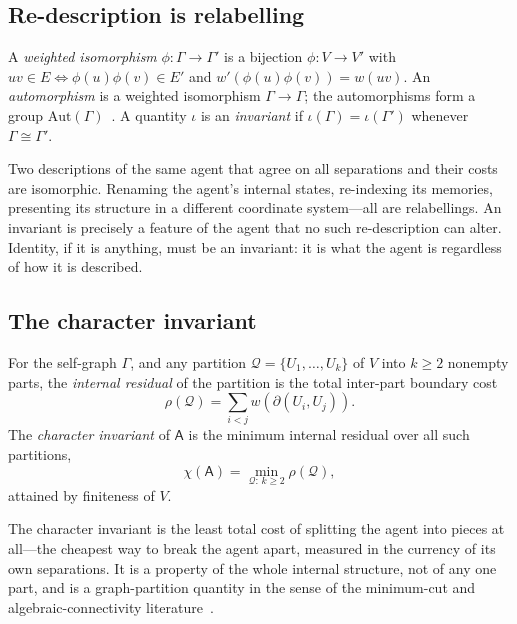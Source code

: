 \documentclass[11pt,twocolumn,a4paper]{article}
\newcommand{\Agent}{\mathsf{A}}
\newcommand{\Self}{\Gamma}          %
\newcommand{\V}{V}
\newcommand{\E}{E}
\newcommand{\wt}{w}
\newcommand{\cut}{\partial}
\newcommand{\Char}{\chi}             %
\begin{document}
\subsection{Re-description is relabelling}

\begin{definition}
\label{def:iso}
A \emph{weighted isomorphism} $\phi:\Self\to\Self'$ is a bijection
$\phi:\V\to\V'$ with $uv\in\E\iff\phi(u)\phi(v)\in\E'$ and
$\wt'(\phi(u)\phi(v))=\wt(uv)$. An \emph{automorphism} is a weighted
isomorphism $\Self\to\Self$; the automorphisms form a group
$\mathrm{Aut}(\Self)$~\cite{godsilroyle2001}. A quantity $\iota$ is an
\emph{invariant} if $\iota(\Self)=\iota(\Self')$ whenever
$\Self\cong\Self'$.
\end{definition}

\begin{remark}
\label{rem:relabel}
Two descriptions of the same agent that agree on all separations and
their costs are isomorphic. Renaming the agent's internal states,
re-indexing its memories, presenting its structure in a different
coordinate system---all are relabellings. An invariant is precisely a
feature of the agent that no such re-description can alter. Identity, if
it is anything, must be an invariant: it is what the agent is regardless
of how it is described.
\end{remark}

\subsection{The character invariant}

\begin{definition}
\label{def:char}
For the self-graph $\Self$, and any partition
$\mathcal{Q}=\{U_1,\dots,U_k\}$ of $\V$ into $k\ge2$ nonempty parts, the
\emph{internal residual} of the partition is the total inter-part
boundary cost
\[
\rho(\mathcal{Q})=\sum_{i<j}\wt(\cut(U_i,U_j)).
\]
The \emph{character invariant} of $\Agent$ is the minimum internal
residual over all such partitions,
\[
\Char(\Agent)=\min_{\mathcal{Q}:\,k\ge2}\rho(\mathcal{Q}),
\]
attained by finiteness of $\V$.
\end{definition}

The character invariant is the least total cost of splitting the agent
into pieces at all---the cheapest way to break the agent apart, measured
in the currency of its own separations. It is a property of the whole
internal structure, not of any one part, and is a graph-partition quantity
in the sense of the minimum-cut and algebraic-connectivity
literature~\cite{fiedler1973,lovasz1993}.
\end{document}
